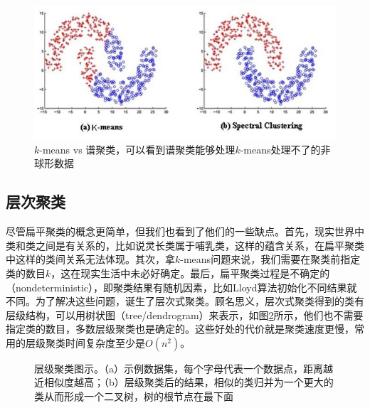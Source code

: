 \begin{figure}[h]
    \includegraphics[scale=0.4]{pic/Comparison-between-K-Means-and-spectral-clustering_W640.jpg}
    \caption{$k$-means vs 谱聚类，可以看到谱聚类能够处理$k$-means处理不了的非球形数据}
    \label{fig: flat_compare}
\end{figure}

\subsection{层次聚类}
尽管扁平聚类的概念更简单，但我们也看到了他们的一些缺点。首先，现实世界中类和类之间是有关系的，比如说灵长类属于哺乳类，这样的蕴含关系，在扁平聚类中这样的类间关系无法体现。其次，拿$k$-means问题来说，我们需要在聚类前指定类的数目$k$，这在现实生活中未必好确定。最后，扁平聚类过程是不确定的（nondeterministic），即聚类结果有随机因素，比如Lloyd算法初始化不同结果就不同。为了解决这些问题，诞生了层次式聚类。顾名思义，层次式聚类得到的类有层级结构，可以用树状图（tree/dendrogram）来表示，如图\ref{fig: hierarchical}所示，他们也不需要指定类的数目，多数层级聚类也是确定的。这些好处的代价就是聚类速度更慢，常用的层级聚类时间复杂度至少是$O(n^2)$。

\begin{figure}[h]
    \hfil
    \caption{层级聚类图示。（a）示例数据集，每个字母代表一个数据点，距离越近相似度越高；（b）层级聚类后的结果，相似的类归并为一个更大的类从而形成一个二叉树，树的根节点在最下面}
    \label{fig: hierarchical}
\end{figure}

